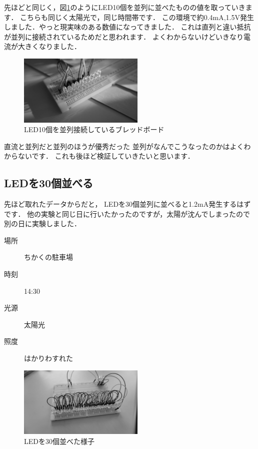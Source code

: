 先ほどと同じく，図\ref{fig:led_par10}のようにLED10個を並列に並べたものの値を取っていきます．
こちらも同じく太陽光で，同じ時間帯です．
この環境で約0.4\si{\milli\ampere},1.5$\si\volt$発生しました．やっと現実味のある数値になってきました．
これは直列と違い抵抗が並列に接続されているためだと思われます．
よくわからないけどいきなり電流が大きくなりました．


\begin{figure}[htbp]
    \centering
    \includegraphics[width=60mm]{./assets/mouse/gray/5.JPG}
    \caption{LED10個を並列接続しているブレッドボード}
    \label{fig:led_par10}
\end{figure}

直流と並列だと並列のほうが優秀だった
並列がなんでこうなったのかはよくわからないです．
これも後ほど検証していきたいと思います．

\subsection{LEDを30個並べる}

先ほど取れたデータからだと，
LEDを30個並列に並べると1.2\si{\milli\ampere}発生するはずです．
他の実験と同じ日に行いたかったのですが，太陽が沈んでしまったので別の日に実験しました．

\begin{description}
  \item[場所]{ちかくの駐車場}
  \item[時刻]{14:30}
  \item[光源]{太陽光}
  \item[照度]{はかりわすれた}
\end{description}


\begin{figure}[htbp]
    \centering
    \includegraphics[width=60mm]{./assets/mouse/gray/10.JPG}
    \caption{LEDを30個並べた様子}
    \label{fig:led_par30}
\end{figure}

